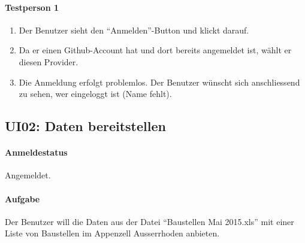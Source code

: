 \paragraph{Testperson 1}
\begin{enumerate}
\item Der Benutzer sieht den ``Anmelden''-Button und klickt darauf.
\item Da er einen Github-Account hat und dort bereits angemeldet ist, wählt er diesen Provider.
\item Die Anmeldung erfolgt problemlos. Der Benutzer wünscht sich anschliessend zu sehen, wer eingeloggt ist (Name fehlt).
\end{enumerate}

\subsection{UI02: Daten bereitstellen}
\paragraph{Anmeldestatus} Angemeldet.

\paragraph{Aufgabe} Der Benutzer will die Daten aus der Datei ``Baustellen Mai 2015.xls'' mit einer Liste von Baustellen im Appenzell Ausserrhoden anbieten.

